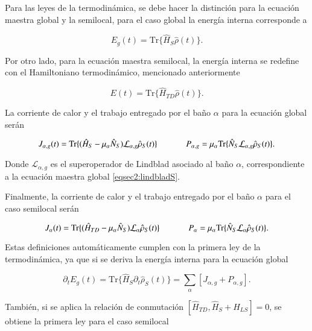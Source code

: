 Para las leyes de la termodinámica, se debe hacer la distinción para la ecuación maestra global y la semilocal, para el caso global la energía interna corresponde a 

\begin{equation*}
    E_{g}(t) = \text{Tr}\{\hat{H}_{S}\hat{\rho}(t) \}.
\end{equation*}

Por otro lado, para la ecuación maestra semilocal, la energía interna se redefine con el Hamiltoniano termodinámico, mencionado anteriormente 

\begin{equation*}
    E(t) = \text{Tr}\{\hat{H}_{TD}\hat{\rho}(t) \}.
\end{equation*}

La corriente de calor y el trabajo entregado por el baño $\alpha$ para la ecuación global serán

\begin{equation*}
    J_{\alpha,g}(t) = \text{Tr}\{(\hat{H}_{S} - \mu_{\alpha}\hat{N}_S)\mathcal{L}_{\alpha,g}\hat{\rho}_{S}(t) \} \hspace{12mm} P_{\alpha,g} = \mu_{\alpha} \text{Tr}\{\hat{N}_{S}\mathcal{L}_{\alpha,g}\hat{\rho}_{S}(t) \}.
\end{equation*}

Donde $\mathcal{L}_{\alpha,g}$ es el superoperador de Lindblad asociado al baño $\alpha$, correspondiente a la ecuación maestra global \ref{eqsec2:lindbladS}.

Finalmente, la corriente de calor y el trabajo entregado por el baño $\alpha$ para el caso semilocal serán

\begin{equation*}
    J_{\alpha}(t) = \text{Tr}\{(\hat{H}_{TD} - \mu_{\alpha}\hat{N}_S)\mathcal{L}_{\alpha}\hat{\rho}_{S}(t) \} \hspace{12mm} P_{\alpha} = \mu_{\alpha} \text{Tr}\{\hat{N}_{S}\mathcal{L}_{\alpha}\hat{\rho}_{S}(t) \}.
\end{equation*}

Estas definiciones automáticamente cumplen con la primera ley de la termodinámica, ya que si se deriva la energía interna para la ecuación global 

\begin{equation*}
    \partial_{t}E_{g}(t) = \text{Tr}\{ \hat{H}_{S}\partial_{t}\hat{\rho}_{S}(t) \} = \sum_{\alpha}[J_{\alpha,g} + P_{\alpha,g}].
\end{equation*}

También, si se aplica la relación de conmutación $[\hat{H}_{TD},\hat{H}_{S} + \hat{H}_{LS}] = 0$, se obtiene la primera ley para el caso semilocal 

